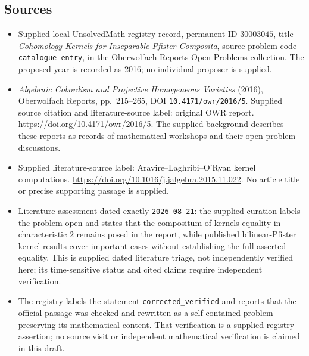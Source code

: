 \documentclass[11pt]{article}
\begin{document}
\subsection{Sources}
\begin{itemize}
\item Supplied local UnsolvedMath registry record, permanent ID \(30003045\), title \emph{Cohomology Kernels for Inseparable Pfister Composita}, source problem code \texttt{catalogue entry}, in the Oberwolfach Reports Open Problems collection. The proposed year is recorded as 2016; no individual proposer is supplied.
\item \emph{Algebraic Cobordism and Projective Homogeneous Varieties} (2016), Oberwolfach Reports, pp.\ 215--265, DOI \texttt{10.4171/owr/2016/5}. Supplied source citation and literature-source label: original OWR report. \url{https://doi.org/10.4171/owr/2016/5}. The supplied background describes these reports as records of mathematical workshops and their open-problem discussions.
\item Supplied literature-source label: Aravire--Laghribi--O'Ryan kernel computations. \url{https://doi.org/10.1016/j.jalgebra.2015.11.022}. No article title or precise supporting passage is supplied.
\item Literature assessment dated exactly \texttt{2026-08-21}: the supplied curation labels the problem open and states that the compositum-of-kernels equality in characteristic \(2\) remains posed in the report, while published bilinear-Pfister kernel results cover important cases without establishing the full asserted equality. This is supplied dated literature triage, not independently verified here; its time-sensitive status and cited claims require independent verification.
\item The registry labels the statement \texttt{corrected\_verified} and reports that the official passage was checked and rewritten as a self-contained problem preserving its mathematical content. That verification is a supplied registry assertion; no source visit or independent mathematical verification is claimed in this draft.
\end{itemize}
\end{document}

